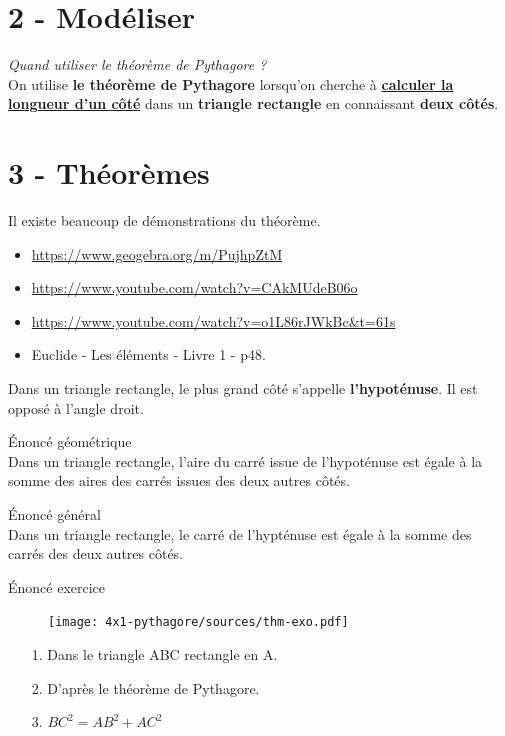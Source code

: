 \documentclass[12pt]{article}
\begin{document}
\newpage
\section*{2 - Modéliser}

\textit{Quand utiliser le théorème de Pythagore ?}\\

On utilise \textbf{le théorème de Pythagore} lorsqu'on cherche à \underline{\textbf{calculer la longueur d'un côté}} dans un \textbf{triangle rectangle} en connaissant \textbf{deux côtés}.



\section*{3 - Théorèmes}

Il existe beaucoup de démonstrations du théorème.

\begin{itemize}
	\item \url{https://www.geogebra.org/m/PujhpZtM}
	\item \url{https://www.youtube.com/watch?v=CAkMUdeB06o}
	\item \url{https://www.youtube.com/watch?v=o1L86rJWkBc&t=61s}
	\item Euclide - Les éléments - Livre 1 - p48.
\end{itemize}


\begin{Definition}
	Dans un triangle rectangle, le plus grand côté s'appelle \textbf{l'hypoténuse}. Il est opposé à l'angle droit.
\end{Definition}



\begin{Theorem}{Énoncé géométrique}\\
	Dans un triangle rectangle, l'aire du carré issue de l'hypoténuse est égale à la somme des aires des carrés issues des deux autres côtés.
\end{Theorem}

\begin{Theorem}{Énoncé général}\\
	Dans un triangle rectangle, le carré de l'hypténuse est égale à la somme des carrés des deux autres côtés.
\end{Theorem}


\begin{Theorem}{Énoncé exercice}\\

	\begin{figure}[H]
		\centering
		\texttt{[image: 4x1-pythagore/sources/thm-exo.pdf]}
	\end{figure}
	
	\begin{enumerate}
		\item[1.] Dans le triangle ABC rectangle en A.
		\item[2.] D'après le théorème de Pythagore.
		\item[3.] $BC^2 = AB^2 + AC^2$
	\end{enumerate}
\end{Theorem}
\end{document}
